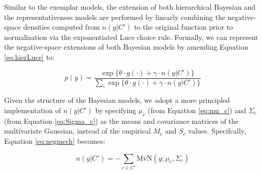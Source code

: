 \documentclass[12pt]{article} \usepackage[letterpaper, margin=1in,
\begin{document}
Similar to the exemplar models, the extension of both hierarchical Bayesian and
the representativeness models are performed by linearly combining the
negative-space densities computed from $n(y|C')$ to the original function prior
to normalization via the exponentiated Luce choice rule. Formally, we can
represent the negative-space extensions of both Bayesian models by amending
Equation \ref{eq:hierLuce} to:

\begin{equation}\label{eq:hierLuceNeg}
p(y) = \dfrac
{ \exp  \{ \theta \cdot g(\cdot) + \gamma \cdot n(y|C') \} } 
{ \sum_i{ \exp \{ \theta \cdot g(\cdot) + \gamma \cdot n(y|C') \}  } }
\end{equation}

Given the structure of the Bayesian models, we adopt a more principled
implementation of $n(y|C')$ by specifying $\mu_c$ (from Equation \ref{eq:mu_c})
and $\Sigma_c$ (from Equation \ref{eq:Sigma_c}) as the means and covariance matrices
of the multivariate Gaussian, instead of the empirical $M_c$ and $S_c$ values.
Specifcally, Equation \ref{eq:negmech} becomes:

\begin{equation}\label{eq:hiernegmech}
n(y|C') = -\sum_{c \in C'} \textrm{MvN}(y; \mu_c,\Sigma_c)
\end{equation}
\end{document}
